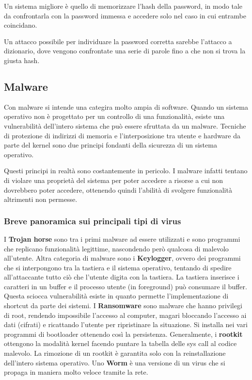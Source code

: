 \documentclass[a4paper]{article}
\begin{document}
Un sistema migliore è quello di memorizzare l’hash della password, in modo tale da confrontarla con la password immessa e accedere solo nel caso in cui entrambe coincidano.

Un attacco possibile per individuare la password corretta sarebbe l'attacco a dizionario, dove vengono confrontate una serie di
parole fino a che non si trova la giusta hash.

\subsection{Malware}
Con malware si intende una categira molto ampia di software. Quando un sistema operativo non è progettato per un controllo di una funzionalità, esiste una vulnerabilità dell'intero sistema che può essere sfruttata da un malware. Tecniche di protezione di indirizzi di memoria e l'interposizione tra utente e hardware da parte del kernel sono due principi fondanti della sicurezza di un sistema operativo.

Questi principi in realtà sono costantemente in pericolo. I malware infatti tentano di violare una proprietà del sistema per poter accedere a risorse a cui non dovrebbero poter accedere, ottenendo quindi l'abilità di svolgere funzionalità altrimenti non permesse.

\subsubsection{Breve panoramica sui principali tipi di virus}
I \textbf{Trojan horse} sono tra i primi malware ad essere utilizzati e sono programmi che replicano funzionalità legittime, nascondendo però qualcosa di malevolo all'utente. Altra categoria di malware sono i \textbf{Keylogger}, ovvero dei programmi che si interpongono tra la tastiera e il sistema operativo, tentando di spedire all'attaccante tutto ciò che l'utente digita con la tastiera. La tastiera inserisce i caratteri in un buffer e il processo utente (in foreground) può consumare il buffer. Questa sciocca vulnerabilità esiste in quanto permette l'implementazione di shortcut da parte dei sistemi. I \textbf{Ransomware} sono malware che hanno privilegi di root, rendendo impossibile l'accesso al computer, magari bloccando l'accesso ai dati (cifrati) e ricattando l'utente per ripristinare la situazione. Si installa nei vari programmi di bootloader ottenendo così la persistenza. Generalmente, i \textbf{rootkit} ottengono la modalità kernel facendo puntare la tabella delle sys call al codice malevolo. La rimozione di un rootkit è garantita solo con la reinstallazione dell'intero sistema operativo. Uno \textbf{Worm} è una versione di un virus che si propaga in maniera molto veloce tramite la rete.
\end{document}

